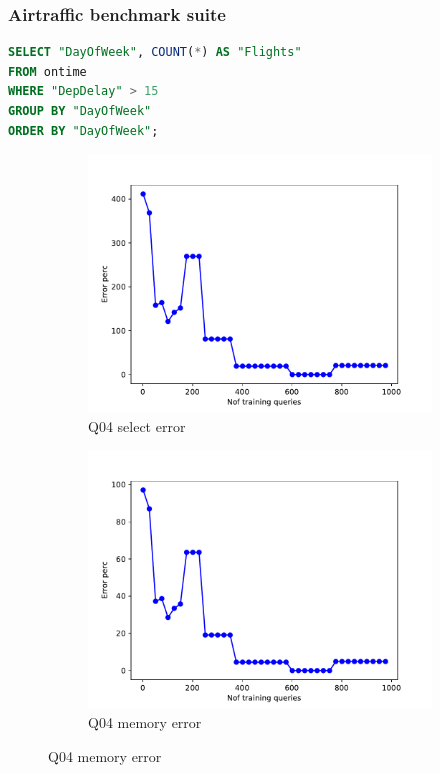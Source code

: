 \begin{frame}[fragile]
\frametitle{Airtraffic benchmark suite}
\begin{lstlisting}[basicstyle=\ttfamily\footnotesize, language=SQL]
SELECT "DayOfWeek", COUNT(*) AS "Flights"
FROM ontime
WHERE "DepDelay" > 15
GROUP BY "DayOfWeek"
ORDER BY "DayOfWeek";
\end{lstlisting}
	\begin{figure}[!htb]
	  \begin{subfigure}[t]{0.4\textwidth}
	    \includegraphics[scale=0.3]{../figs/airtraffic/airtraffic_sel04_error.pdf}
	    \caption{Q04 select error}
	    \label{fig:sel04}
	  \end{subfigure}
	  \begin{subfigure}[t]{0.4\textwidth}
	    \includegraphics[scale=0.3]{../figs/airtraffic/airtraffic_q04_memerror.pdf}
	    \caption{Q04 memory error}
	    \label{fig:mem04}
	   \end{subfigure}
	\end{figure}
\end{frame}

